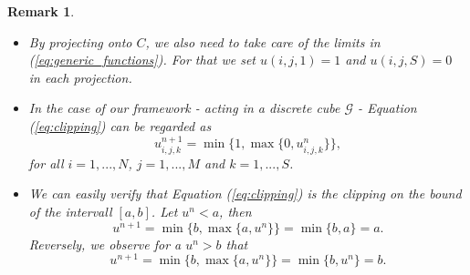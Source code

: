 \documentclass[abstracton]{scrreprt}
\newtheorem{remark}[theorem]{Remark}
\begin{document}
            \begin{remark}
                \label{rem:clipping}
                \begin{itemize}
                    \item By projecting onto $C$, we also need to take care of the limits in (\ref{eq:generic_functions}). For that we set $u(i, j, 1) = 1$ and $u(i, j, S) = 0$ in each projection.
                    \item In the case of our framework - acting in a discrete cube $\mathcal{G}$ - Equation (\ref{eq:clipping}) can be regarded as
                        $$
                            u^{n+1}_{i,j,k} = \min\{1, \max \{ 0, u^{n}_{i,j,k} \} \},
                        $$
                    for all $i = 1, ..., N$, $j = 1, ..., M$ and $k = 1, ..., S$.
                    \item We can easily verify that Equation (\ref{eq:clipping}) is the clipping on the bound of the intervall $[a, b]$. Let $u^{n} < a$, then
                        $$
                            u^{n+1} = \min\{b, \max \{ a, u^{n} \} \} = \min\{b, a\} = a.
                        $$
                    Reversely, we observe for a $u^{n} > b$ that
                        $$
                            u^{n+1} = \min\{b, \max \{ a, u^{n} \} \} = \min\{b, u^{n}\} = b.
                        $$
                \end{itemize}
            \end{remark}
\end{document}
